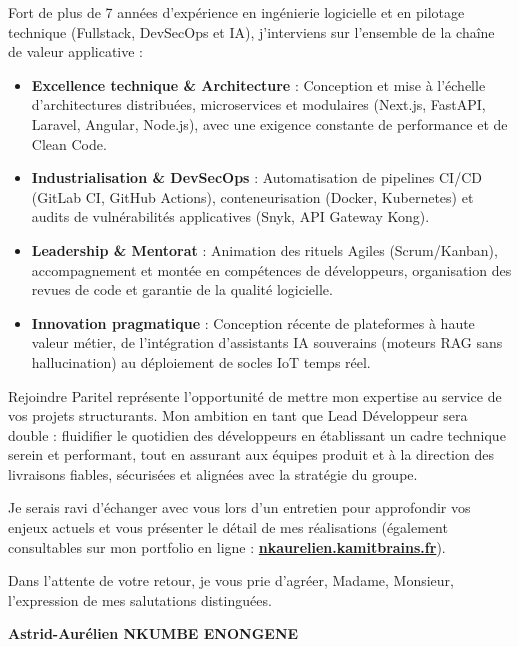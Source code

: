 \documentclass[10.5pt,a4paper]{article}
\begin{document}
Fort de plus de 7 années d’expérience en ingénierie logicielle et en pilotage technique (Fullstack, DevSecOps et IA), j’interviens sur l’ensemble de la chaîne de valeur applicative :
\begin{itemize}[leftmargin=1.4em, itemsep=0.15em, topsep=0.2em]
    \item \textbf{Excellence technique \& Architecture} : Conception et mise à l'échelle d'architectures distribuées, microservices et modulaires (Next.js, FastAPI, Laravel, Angular, Node.js), avec une exigence constante de performance et de Clean Code.
    \item \textbf{Industrialisation \& DevSecOps} : Automatisation de pipelines CI/CD (GitLab CI, GitHub Actions), conteneurisation (Docker, Kubernetes) et audits de vulnérabilités applicatives (Snyk, API Gateway Kong).
    \item \textbf{Leadership \& Mentorat} : Animation des rituels Agiles (Scrum/Kanban), accompagnement et montée en compétences de développeurs, organisation des revues de code et garantie de la qualité logicielle.
    \item \textbf{Innovation pragmatique} : Conception récente de plateformes à haute valeur métier, de l'intégration d'assistants IA souverains (moteurs RAG sans hallucination) au déploiement de socles IoT temps réel.
\end{itemize}

Rejoindre Paritel représente l'opportunité de mettre mon expertise au service de vos projets structurants. Mon ambition en tant que Lead Développeur sera double : fluidifier le quotidien des développeurs en établissant un cadre technique serein et performant, tout en assurant aux équipes produit et à la direction des livraisons fiables, sécurisées et alignées avec la stratégie du groupe.

Je serais ravi d'échanger avec vous lors d'un entretien pour approfondir vos enjeux actuels et vous présenter le détail de mes réalisations (également consultables sur mon portfolio en ligne : \href{https://nkaurelien.kamitbrains.fr}{\textbf{nkaurelien.kamitbrains.fr}}).

Dans l’attente de votre retour, je vous prie d'agréer, Madame, Monsieur, l’expression de mes salutations distinguées.

\vspace{1.2em}

\begin{flushright}
    \textbf{Astrid-Aurélien NKUMBE ENONGENE}
\end{flushright}
\end{document}

